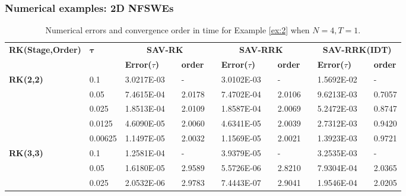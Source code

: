 \documentclass[aspectratio=169]{beamer}
\begin{document}
	\begin{frame}\frametitle{Numerical examples: 2D NFSWEs}
	\begin{table}[H]\tiny
	  \centering
	  \caption{Numerical errors and convergence order in time for Example \ref{ex:2} when $N=4, T = 1$.}
	  \begin{tabular}{lllllrlrlrlrlrl}
	  \toprule
	  \multicolumn{2}{l}{\multirow{2}[3]{*}{\textbf{RK(Stage,Order)}}} & \multicolumn{2}{l}{\multirow{2}[3]{*}{$\bm{\tau}$}} & \multicolumn{3}{c}{\textbf{SAV-RK}} &       & \multicolumn{3}{c}{\textbf{SAV-RRK}} &       & \multicolumn{3}{c}{\textbf{SAV-RRK(IDT)}} \\
	  \cmidrule{5-7}\cmidrule{9-11}\cmidrule{13-15}    \multicolumn{2}{l}{} & \multicolumn{2}{l}{} & \textbf{Error($\tau$)} &       & \textbf{order} &       & \textbf{Error($\tau$)} &       & \textbf{order} &       & \textbf{Error($\tau$)} &       & \textbf{order} \\
	  \hline
	  \multicolumn{2}{l}{\multirow{5}[0]{*}{\textbf{RK(2,2)}}} & \multicolumn{2}{l}{0.1} & 3.0217E-03 &       & -     &       & 3.0102E-03 &       & -     &       & 1.5692E-02 &       & - \\
	  \multicolumn{2}{l}{} & \multicolumn{2}{l}{0.05} & 7.4615E-04 &       & 2.0178  &       & 7.4702E-04 &       & 2.0106  &       & 9.6213E-03 &       & 0.7057  \\
	  \multicolumn{2}{l}{} & \multicolumn{2}{l}{0.025} & 1.8513E-04 &       & 2.0109  &       & 1.8587E-04 &       & 2.0069  &       & 5.2472E-03 &       & 0.8747  \\
	  \multicolumn{2}{l}{} & \multicolumn{2}{l}{0.0125} & 4.6090E-05 &       & 2.0060  &       & 4.6341E-05 &       & 2.0039  &       & 2.7312E-03 &       & 0.9420  \\
	  \multicolumn{2}{l}{} & \multicolumn{2}{l}{0.00625} & 1.1497E-05 &       & 2.0032  &       & 1.1569E-05 &       & 2.0021  &       & 1.3923E-03 &       & 0.9721  \\
	  \multicolumn{2}{l}{\multirow{5}[0]{*}{\textbf{RK(3,3)}}} & \multicolumn{2}{l}{0.1} & 1.2581E-04 &       & -     &       & 3.9379E-05 &       & -     &       & 3.2535E-03 &       & - \\
	  \multicolumn{2}{l}{} & \multicolumn{2}{l}{0.05} & 1.6180E-05 &       & 2.9589  &       & 5.5726E-06 &       & 2.8210  &       & 7.9304E-04 &       & 2.0365  \\
	  \multicolumn{2}{l}{} & \multicolumn{2}{l}{0.025} & 2.0532E-06 &       & 2.9783  &       & 7.4443E-07 &       & 2.9041  &       & 1.9546E-04 &       & 2.0205  \\

\end{tabular}
\end{table}
\end{frame}
\end{document}

